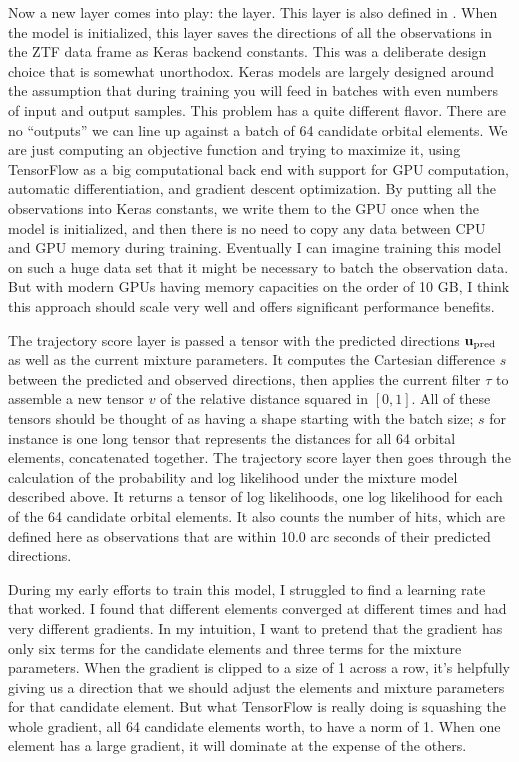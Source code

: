 Now a new layer comes into play: the  layer.
This layer is also defined in .
When the model is initialized, this layer saves the directions of all the observations in the ZTF data frame as Keras backend constants.
This was a deliberate design choice that is somewhat unorthodox.
Keras models are largely designed around the assumption that during training you will feed in batches with even numbers of input and output samples.
This problem has a quite different flavor.
There are no ``outputs'' we can line up against a batch of 64 candidate orbital elements.
We are just computing an objective function and trying to maximize it, using TensorFlow as a big computational back end with
support for GPU computation, automatic differentiation, and gradient descent optimization.
By putting all the observations into Keras constants, we write them to the GPU once when the model is initialized,
and then there is no need to copy any data between CPU and GPU memory during training.
Eventually I can imagine training this model on such a huge data set that it might be necessary to batch the observation data.
But with modern GPUs having memory capacities on the order of 10 GB, I think this approach should scale very well and offers significant performance benefits.

The trajectory score layer is passed a tensor with the predicted directions $\mathbf{u}_{\mathrm{pred}}$ as well as the current mixture parameters.
It computes the Cartesian difference $s$ between the predicted and observed directions, 
then applies the current filter $\tau$ to assemble a new tensor $v$ of the relative distance squared in $[0,1]$.
All of these tensors should be thought of as having a shape starting with the batch size;
$s$ for instance is one long tensor that represents the distances for all 64 orbital elements, concatenated together.
The trajectory score layer then goes through the calculation of the probability and log likelihood under the mixture model described above.
It returns a tensor of log likelihoods, one log likelihood for each of the 64 candidate orbital elements.
It also counts the number of hits, which are defined here as observations that are within 10.0 arc seconds of their predicted directions.

During my early efforts to train this model, I struggled to find a learning rate that worked.
I found that different elements converged at different times and had very different gradients.
In my intuition, I want to pretend that the gradient has only six terms for the candidate elements and three terms for the mixture parameters.
When the gradient is clipped to a size of 1 across a row, 
it's helpfully giving us a direction that we should adjust the elements and mixture parameters for that candidate element.
But what TensorFlow is really doing is squashing the whole gradient, all 64 candidate elements worth, to have a norm of 1.
When one element has a large gradient, it will dominate at the expense of the others.

